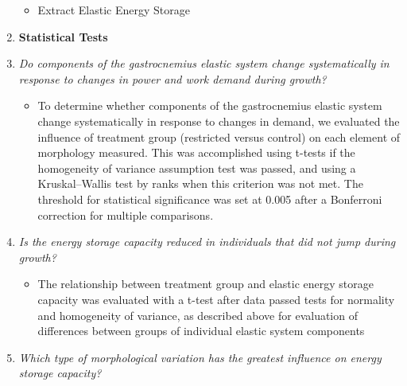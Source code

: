 \documentclass[
]{article}
\providecommand{\tightlist}{%
  \setlength{\itemsep}{0pt}\setlength{\parskip}{0pt}}
\begin{document}
\begin{enumerate}
  \begin{itemize}
  \tightlist
  \item
    Extract Elastic Energy Storage
  \end{itemize}
\item
  \textbf{Statistical Tests}
\item
  \emph{Do components of the gastrocnemius elastic system change
  systematically in response to changes in power and work demand during
  growth?}

  \begin{itemize}
  \tightlist
  \item
    To determine whether components of the gastrocnemius elastic system
    change systematically in response to changes in demand, we evaluated
    the influence of treatment group (restricted versus control) on each
    element of morphology measured. This was accomplished using t-tests
    if the homogeneity of variance assumption test was passed, and using
    a Kruskal--Wallis test by ranks when this criterion was not met. The
    threshold for statistical significance was set at 0.005 after a
    Bonferroni correction for multiple comparisons.
  \end{itemize}
\item
  \emph{Is the energy storage capacity reduced in individuals that did
  not jump during growth?}

  \begin{itemize}
  \tightlist
  \item
    The relationship between treatment group and elastic energy storage
    capacity was evaluated with a t-test after data passed tests for
    normality and homogeneity of variance, as described above for
    evaluation of differences between groups of individual elastic
    system components
  \end{itemize}
\item
  \emph{Which type of morphological variation has the greatest influence
  on energy storage capacity?}


\end{enumerate}
\end{document}
